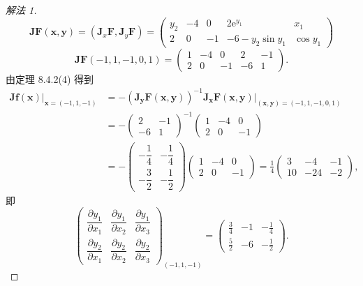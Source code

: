 \begin{proof}[解法 1]
\[
  \boldsymbol{J}\boldsymbol{F}(\boldsymbol{x},\boldsymbol{y}) = (\boldsymbol{J}_{x}\boldsymbol{F},\boldsymbol{J}_{y}\boldsymbol{F}) = \begin{pmatrix} y_{2} & -4 & 0 & 2\mathrm{e}^{y_{1}} & x_{1} \\ 2 & 0 & -1 & -6 - y_{2}\sin y_{1} & \cos y_{1} \end{pmatrix}
\]
\[
  \boldsymbol{J}\boldsymbol{F}(-1,1,-1,0,1) = \begin{pmatrix} 1 & -4 & 0 & 2 & -1 \\ 2 & 0 & -1 & -6 & 1 \end{pmatrix}.
\]
由定理 8.4.2(4) 得到
\begin{align*}
  \left.\boldsymbol{J}\boldsymbol{f}(\boldsymbol{x})\right|_{\boldsymbol{x} = (-1,1,-1)} &= -\left(\boldsymbol{J}_{\boldsymbol{y}}\boldsymbol{F}(\boldsymbol{x},\boldsymbol{y})\right)^{-1}\boldsymbol{J}_{\boldsymbol{x}}\boldsymbol{F}(\boldsymbol{x},\boldsymbol{y})\bigg|_{(\boldsymbol{x},\boldsymbol{y}) = (-1,1,-1,0,1)} \\
  &= -\begin{pmatrix} 2 & -1 \\ -6 & 1 \end{pmatrix}^{-1}\begin{pmatrix} 1 & -4 & 0 \\ 2 & 0 & -1 \end{pmatrix} \\
  &= -\begin{pmatrix} -\dfrac{1}{4} & -\dfrac{1}{4} \\[2pt] -\dfrac{3}{2} & -\dfrac{1}{2} \end{pmatrix}\begin{pmatrix} 1 & -4 & 0 \\ 2 & 0 & -1 \end{pmatrix} = \frac{1}{4}\begin{pmatrix} 3 & -4 & -1 \\ 10 & -24 & -2 \end{pmatrix},
\end{align*}
即
\[
  \begin{pmatrix}
    \dfrac{\partial y_{1}}{\partial x_{1}} & \dfrac{\partial y_{1}}{\partial x_{2}} & \dfrac{\partial y_{1}}{\partial x_{3}} \\
    \dfrac{\partial y_{2}}{\partial x_{1}} & \dfrac{\partial y_{2}}{\partial x_{2}} & \dfrac{\partial y_{2}}{\partial x_{3}}
  \end{pmatrix}_{(-1,1,-1)} = \begin{pmatrix} \frac{3}{4} & -1 & -\frac{1}{4} \\[2pt] \frac{5}{2} & -6 & -\frac{1}{2} \end{pmatrix}.
\]
\end{proof}

